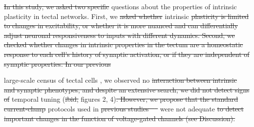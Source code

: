 \documentclass{article}
\providecommand{\DIFaddtex}[1]{{\protect\color{blue}{#1}}} %
\providecommand{\DIFdeltex}[1]{{\protect\color{red}\sout{#1}}}                      %
\providecommand{\DIFaddbegin}{} %
\providecommand{\DIFaddend}{} %
\providecommand{\DIFdelbegin}{} %
\providecommand{\DIFdelend}{} %
\providecommand{\DIFadd}[1]{\texorpdfstring{\DIFaddtex{#1}}{#1}} %
\providecommand{\DIFdel}[1]{\texorpdfstring{\DIFdeltex{#1}}{}} %
\newcommand{\DIFscaledelfig}{0.5}
\newlength{\DIFdelgraphicswidth} %
\newlength{\DIFdelgraphicsheight} %
\newcommand{\DIFaddincludegraphics}[2][]{{\color{blue}\fbox{\DIFOincludegraphics[#1]{#2}}}} %
\newcommand{\DIFdelincludegraphics}[2][]{%
\sbox{\DIFdelgraphicsbox}{\DIFOincludegraphics[#1]{#2}}%
\settoboxwidth{\DIFdelgraphicswidth}{\DIFdelgraphicsbox} %
\settoboxtotalheight{\DIFdelgraphicsheight}{\DIFdelgraphicsbox} %
\scalebox{\DIFscaledelfig}{%
\parbox[b]{\DIFdelgraphicswidth}{\usebox{\DIFdelgraphicsbox}\\[-\baselineskip] \rule{\DIFdelgraphicswidth}{0em}}\llap{\resizebox{\DIFdelgraphicswidth}{\DIFdelgraphicsheight}{%
\setlength{\unitlength}{\DIFdelgraphicswidth}%
\begin{picture}(1,1)%
\thicklines\linethickness{2pt} %
{\color[rgb]{1,0,0}\put(0,0){\framebox(1,1){}}}%
{\color[rgb]{1,0,0}\put(0,0){\line( 1,1){1}}}%
{\color[rgb]{1,0,0}\put(0,1){\line(1,-1){1}}}%
\end{picture}%
}\hspace*{3pt}}} %
} %
\DeclareRobustCommand{\DIFaddbegin}{\DIFOaddbegin \let\includegraphics\DIFaddincludegraphics} %
\DeclareRobustCommand{\DIFaddend}{\DIFOaddend \let\includegraphics\DIFOincludegraphics} %
\DeclareRobustCommand{\DIFdelbegin}{\DIFOdelbegin \let\includegraphics\DIFdelincludegraphics} %
\DeclareRobustCommand{\DIFdelend}{\DIFOaddend \let\includegraphics\DIFOincludegraphics} %
\begin{document}
\DIFdelbegin \DIFdel{In this study, we asked two specific }\DIFdelend \DIFaddbegin \DIFadd{Specifically, we ask three }\DIFaddend questions about the properties of intrinsic plasticity in tectal networks. First, we \DIFdelbegin \DIFdel{asked whether }\DIFdelend \DIFaddbegin \DIFadd{test whether the intrinsic temporal tuning to either faster (more synchronous) or slower (asynchronous) inputs would change in response to sensory stimulation. Then, we ask whether }\DIFaddend intrinsic \DIFdelbegin \DIFdel{plasticity is limited to changes in excitability, or whether it is more nuanced and can differentially adjust neuronal responsiveness to inputs with different dynamics. Second, we checked whether changes in intrinsic properties in the tectum are a homeostatic response to each cell's history of synaptic activation, or if they are independent of synaptic properties. In our previous }\DIFdelend \DIFaddbegin \DIFadd{temporal tuning of individual tectal cells is coordinated with the typical length of synaptic currents they receive. Finally, we try to identify the mechanisms that may underlie temporal tuning variability. 
}

\DIFadd{In our previously published }\DIFaddend large-scale census of tectal cells \citep{ciarleglio2015}, we observed no \DIFdelbegin \DIFdel{interaction between intrinsic and synaptic phenotypes, and despite an extensive search, we did not detect signs of }\DIFdelend \DIFaddbegin \DIFadd{signs of intrinsic }\DIFaddend temporal tuning (\DIFdelbegin \DIFdel{ibid,  }\DIFdelend figures 2, 4)\DIFdelbegin \DIFdel{. However, we propose that the standard current-clamp }\DIFdelend \DIFaddbegin \DIFadd{, and no interaction between intrinsic and synaptic phenotypes. We argue however, that the current clamp }\DIFaddend protocols used in \DIFdelbegin \DIFdel{previous studies \mbox{%
\citep{pratt2007,hamodi2014} }\hspace{0pt}%
}\DIFdelend \DIFaddbegin \DIFadd{earlier studies }\DIFaddend were not adequate \DIFdelbegin \DIFdel{to detect important changes in the function of voltage-gated channels (see Discussion). 
}%
\end{document}
